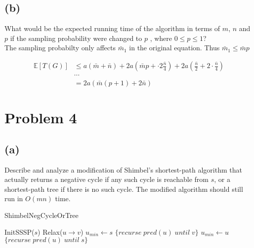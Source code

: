 \documentclass[12pt]{article}
\begin{document}
\subsection*{(b)}
What would be the expected running time of the algorithm in terms of
$m$, $n$ and $p$ if the sampling probability were changed to $p$ ,
where $0 \le p \le 1$?\\

The sampling probabilty only affects $\bar{m}_1$ in the original equation.
Thus $\bar{m}_1 \le \bar{m}p$

\begin{align*}
    \mathbb{E}[T(G)] &\le a(\bar{m} + \bar{n}) + 2a\left(\bar{m}p
                      + \cdot2\frac{\bar{n}}{4}\right)
                      + 2a\left(\frac{\bar{n}}{2} + 2\cdot\frac{\bar{n}}{4}\right)\\
                     & \cdots \\
                     &= 2a(\bar{m}(p + 1) + 2\bar{n})
\end{align*}


\section*{Problem 4}

\subsection*{(a)}
Describe and analyze a modification of Shimbel's shortest-path algorithm
that actually returns a negative cycle if any such cycle is reachable
from $s$, or a shortest-path tree if there is no such cycle. The modified
algorithm should still run in $O(mn)$ time.

\begin{algorithm}
\caption{ShimbelNegCycleOrTree}
\begin{algorithmic}
    \STATE InitSSSP($s$)
                \STATE Relax($u \rightarrow v$)
            \ENDIF
        \ENDFOR
    \ENDFOR
    \STATE $u_{min} \leftarrow s$
            \RETURN $\{ recurse\; pred(u)\; until\; v \}$
        \ENDIF
            \STATE $u_{min} \leftarrow u$
        \ENDIF
        \RETURN $\{ recurse\; pred(u)\; until\; s \}$
    \ENDFOR
\end{algorithmic}
\end{algorithm}
\end{document}
